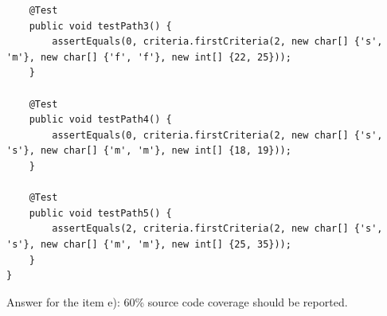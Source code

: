 \begin{solution}
\begin{lstlisting}
    @Test
    public void testPath3() {
        assertEquals(0, criteria.firstCriteria(2, new char[] {'s', 'm'}, new char[] {'f', 'f'}, new int[] {22, 25}));
    }
    
    @Test
    public void testPath4() {
        assertEquals(0, criteria.firstCriteria(2, new char[] {'s', 's'}, new char[] {'m', 'm'}, new int[] {18, 19}));
    }
    
    @Test
    public void testPath5() {
        assertEquals(2, criteria.firstCriteria(2, new char[] {'s', 's'}, new char[] {'m', 'm'}, new int[] {25, 35}));
    }
}
    \end{lstlisting}
    
    Answer for the item e): 60\% source code coverage should be reported.
\end{solution}